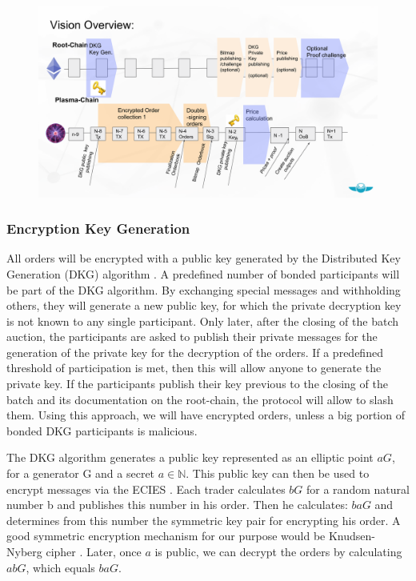 \documentclass[11pt,parskip=full]{scrartcl}%
\begin{document}
\begin{figure}
\centering
\includegraphics[width=\textwidth]{overview_tradeflow.png}
\end{figure}



\subsubsection{Encryption Key Generation}
All orders will be encrypted with a public key generated by the Distributed Key Generation (DKG) algorithm \cite{DKG}. A predefined number of bonded participants will be part of the DKG algorithm.  By exchanging special messages and withholding others, they will generate a new public key, for which the private decryption key is not known to any single participant. Only later, after the closing of the batch auction, the participants are asked to publish their private messages for the generation of the private key for the decryption of the orders. If a predefined threshold of participation is met, then this will allow anyone to generate the private key. If the participants publish their key previous to the closing of the batch and its documentation on the root-chain, the protocol will allow to slash them. Using this approach, we will have encrypted orders, unless a big portion of bonded DKG participants is malicious.

The DKG algorithm generates a public key represented as an elliptic point $aG\label{public key}$, for a generator G and a secret $a\in \mathbb{N}$. This public key can then be used to encrypt messages via the ECIES \cite{ECIES}. Each trader calculates $bG \label{salt}$ for a random natural number b and publishes this number in his order. Then he calculates: $baG$ and determines from this number the symmetric key pair for encrypting his order. A good symmetric encryption mechanism for our purpose would be Knudsen-Nyberg cipher \cite{cipher}. Later, once $a$ is public, we can decrypt the orders by calculating $abG$, which equals $baG$.
\end{document}

